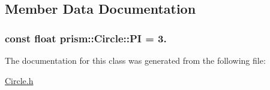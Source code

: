 \subsection{Member Data Documentation}
\subsubsection[{\texorpdfstring{PI}{PI}}]{\setlength{\rightskip}{0pt plus 5cm}const float prism\+::\+Circle\+::\+PI = 3.}\hypertarget{classprism_1_1_circle_a271b9a742c518b86b678cb4cd5b8f22c}{}\label{classprism_1_1_circle_a271b9a742c518b86b678cb4cd5b8f22c}


The documentation for this class was generated from the following file\+:\begin{DoxyCompactItemize}
\item 
\hyperlink{_circle_8h}{Circle.\+h}\end{DoxyCompactItemize}
